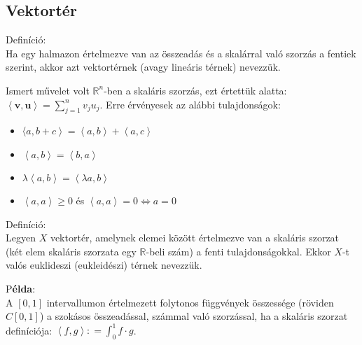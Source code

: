 \documentclass[12pt,a4paper]{scrartcl}
\providecommand{\tightlist}{%
  \setlength{\itemsep}{0pt}\setlength{\parskip}{0pt}}
\newenvironment{definicio}{}{}
\newenvironment{pelda}{}{}
\begin{document}
\hypertarget{vektorter}{%
\subsection{Vektortér}\label{vektorter}}

\begin{definicio}

Definíció:\\
Ha egy halmazon értelmezve van az összeadás és a skalárral való szorzás
a fentiek szerint, akkor azt vektortérnek (avagy lineáris térnek)
nevezzük.

\end{definicio}

Ismert művelet volt \({\mathbb{R}}^{n}\)-ben a skaláris szorzás, ezt
értettük alatta:
\(\left\langle {\mathbf{v},\mathbf{u}} \right\rangle = {\sum\limits_{j = 1}^{n}{v_{j}u_{j}}}\).
Erre érvényesek az alábbi tulajdonságok:

\begin{itemize}
\tightlist
\item
  〈\(\left. {a,b + c} \right\rangle = \left\langle {a,b} \right\rangle + \left\langle {a,c} \right\rangle\)
\item
  \(\left\langle {a,b} \right\rangle = \left\langle {b,a} \right\rangle\)
\item
  \(\lambda\left\langle {a,b} \right\rangle = \left\langle {\lambda a,b} \right\rangle\)
\item
  \(\left\langle {a,a} \right\rangle \geq 0\) és
  \(\left. \left\langle {a,a} \right\rangle = 0\Leftrightarrow a = 0 \right.\)
\end{itemize}

\begin{definicio}

Definíció:\\
Legyen \(X\) vektortér, amelynek elemei között értelmezve van a skaláris
szorzat (két elem skaláris szorzata egy \(\mathbb{R}\)-beli szám) a
fenti tulajdonságokkal. Ekkor \(X\)-t valós euklideszi (eukleidészi)
térnek nevezzük.

\end{definicio}

\begin{pelda}

P\textbf{élda}:\\
A \(\left\lbrack 0,1 \right\rbrack\) intervallumon értelmezett folytonos
függvények összessége (röviden \(C\left\lbrack 0,1 \right\rbrack\)) a
szokásos összeadással, számmal való szorzással, ha a skaláris szorzat
definíciója:
\(\left\langle {f,g} \right\rangle: = {\int_{0}^{1}{f \cdot g}}\).

\end{pelda}
\end{document}
